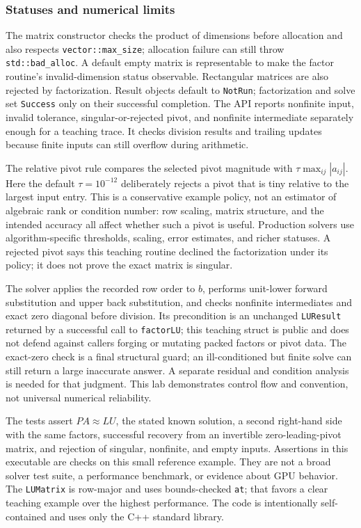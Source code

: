\subsubsection{Statuses and numerical limits}\label{statuses-and-numerical-limits}

The matrix constructor checks the product of dimensions before allocation and also respects \texttt{vector::max\_size}; allocation failure can still throw \texttt{std::bad\_alloc}. A default empty matrix is representable to make the factor routine's invalid-dimension status observable. Rectangular matrices are also rejected by factorization. Result objects default to \texttt{NotRun}; factorization and solve set \texttt{Success} only on their successful completion. The API reports nonfinite input, invalid tolerance, singular-or-rejected pivot, and nonfinite intermediate separately enough for a teaching trace. It checks division results and trailing updates because finite inputs can still overflow during arithmetic.

The relative pivot rule compares the selected pivot magnitude with \(\tau\max_{ij}|a_{ij}|\). Here the default \(\tau=10^{-12}\) deliberately rejects a pivot that is tiny relative to the largest input entry. This is a conservative example policy, not an estimator of algebraic rank or condition number: row scaling, matrix structure, and the intended accuracy all affect whether such a pivot is useful. Production solvers use algorithm-specific thresholds, scaling, error estimates, and richer statuses. A rejected pivot says this teaching routine declined the factorization under its policy; it does not prove the exact matrix is singular.

The solver applies the recorded row order to \(b\), performs unit-lower forward substitution and upper back substitution, and checks nonfinite intermediates and exact zero diagonal before division. Its precondition is an unchanged \texttt{LUResult} returned by a successful call to \texttt{factorLU}; this teaching struct is public and does not defend against callers forging or mutating packed factors or pivot data. The exact-zero check is a final structural guard; an ill-conditioned but finite solve can still return a large inaccurate answer. A separate residual and condition analysis is needed for that judgment. This lab demonstrates control flow and convention, not universal numerical reliability.

The tests assert \(PA\approx LU\), the stated known solution, a second right-hand side with the same factors, successful recovery from an invertible zero-leading-pivot matrix, and rejection of singular, nonfinite, and empty inputs. Assertions in this executable are checks on this small reference example. They are not a broad solver test suite, a performance benchmark, or evidence about GPU behavior. The \texttt{LUMatrix} is row-major and uses bounds-checked \texttt{at}; that favors a clear teaching example over the highest performance. The code is intentionally self-contained and uses only the C++ standard library.

